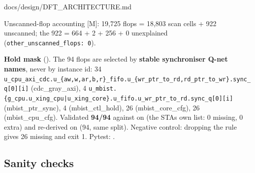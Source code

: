 \begin{relocated}{docs/design/DFT_ARCHITECTURE.md}
{}

Unscanned-flop accounting {[}M{]}: 19,725 flops = 18,803 scan cells +
922 unscanned; the 922 = 664 + 2 + 256 + 0 unexplained
(\texttt{other\_\allowbreak{}unscanned\_\allowbreak{}flops:\allowbreak{}\ 0}).

\textbf{Hold mask} (). The 94 flops are
selected by \textbf{stable synchroniser Q-net names}, never by instance
id: 34
\texttt{u\_\allowbreak{}cpu\_\allowbreak{}axi\_\allowbreak{}cdc.\allowbreak{}u\_\allowbreak{}\{aw,\allowbreak{}w,\allowbreak{}ar,\allowbreak{}b,\allowbreak{}r\}\_\allowbreak{}fifo.\allowbreak{}u\_\allowbreak{}\{wr\_\allowbreak{}ptr\_\allowbreak{}to\_\allowbreak{}rd,\allowbreak{}rd\_\allowbreak{}ptr\_\allowbreak{}to\_\allowbreak{}wr\}.\allowbreak{}sync\_\allowbreak{}q[0][i]}
(cdc\_\allowbreak{}gray\_\allowbreak{}axi), 4
\texttt{u\_\allowbreak{}mbist.\allowbreak{}\{g\_\allowbreak{}cpu.\allowbreak{}u\_\allowbreak{}xing\_\allowbreak{}cpu|u\_\allowbreak{}xing\_\allowbreak{}core\}.\allowbreak{}u\_\allowbreak{}fifo.\allowbreak{}u\_\allowbreak{}wr\_\allowbreak{}ptr\_\allowbreak{}to\_\allowbreak{}rd.\allowbreak{}sync\_\allowbreak{}q[0][i]}
(mbist\_\allowbreak{}ptr\_\allowbreak{}sync), 4 
(mbist\_\allowbreak{}ctl\_\allowbreak{}hold), 26
(mbist\_\allowbreak{}core\_\allowbreak{}cfg), 26 
(mbist\_\allowbreak{}cpu\_\allowbreak{}cfg). Validated \textbf{94/94}
against
on  (the STA\textquotesingle s own list: 0
missing, 0 extra) and re-derived on  (94,
same split). Negative control: dropping the  rule
gives 26 missing and exit 1. Pytest:
.

\subsection{Sanity checks}\label{tm:ch:dft-architecture:185-sanity-checks}

{\footnotesize\setlength{\tabcolsep}{3pt}

}
\end{relocated}
